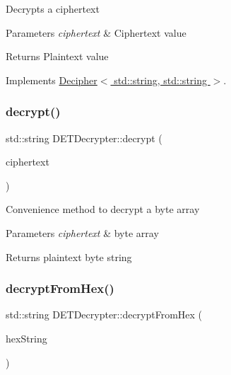 Decrypts a ciphertext 
\begin{DoxyParams}{Parameters}
{\em ciphertext} & Ciphertext value \\
\hline
\end{DoxyParams}
\begin{DoxyReturn}{Returns}
Plaintext value 
\end{DoxyReturn}


Implements \hyperlink{classDecipher_ac6b8c369eda2d7e17fa90cb594cf41b6}{Decipher$<$ std\+::string, std\+::string $>$}.

\mbox{\label{classDETDecrypter_a1a0f8ebde80190b4d28ed071d139fc3a}} 
\subsubsection{\texorpdfstring{decrypt()}{decrypt()}\hspace{0.1cm}{\footnotesize\ttfamily [2/2]}}
{\footnotesize\ttfamily std\+::string D\+E\+T\+Decrypter\+::decrypt (\begin{DoxyParamCaption}\item[{Crypto\+P\+P\+::\+Sec\+Byte\+Block \&}]{ciphertext }\end{DoxyParamCaption})}

Convenience method to decrypt a byte array 
\begin{DoxyParams}{Parameters}
{\em ciphertext} & byte array \\
\hline
\end{DoxyParams}
\begin{DoxyReturn}{Returns}
plaintext byte string 
\end{DoxyReturn}
\mbox{\label{classDETDecrypter_acb1551670a0c4161a362f20c0eed0b3a}} 
\subsubsection{\texorpdfstring{decrypt\+From\+Hex()}{decryptFromHex()}}
{\footnotesize\ttfamily std\+::string D\+E\+T\+Decrypter\+::decrypt\+From\+Hex (\begin{DoxyParamCaption}\item[{std\+::string \&}]{hex\+String }\end{DoxyParamCaption})}

